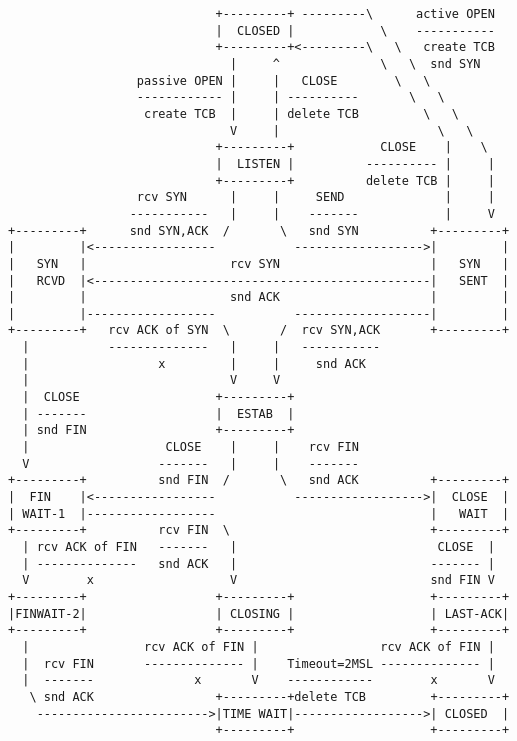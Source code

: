 \documentclass[varwidth=38em,crop]{standalone}
\begin{document}
\pagestyle{empty}

\begin{verbatim}
                             +---------+ ---------\      active OPEN
                             |  CLOSED |            \    -----------
                             +---------+<---------\   \   create TCB
                               |     ^              \   \  snd SYN
                  passive OPEN |     |   CLOSE        \   \
                  ------------ |     | ----------       \   \
                   create TCB  |     | delete TCB         \   \
                               V     |                      \   \
                             +---------+            CLOSE    |    \
                             |  LISTEN |          ---------- |     |
                             +---------+          delete TCB |     |
                  rcv SYN      |     |     SEND              |     |
                 -----------   |     |    -------            |     V
+---------+      snd SYN,ACK  /       \   snd SYN          +---------+
|         |<-----------------           ------------------>|         |
|   SYN   |                    rcv SYN                     |   SYN   |
|   RCVD  |<-----------------------------------------------|   SENT  |
|         |                    snd ACK                     |         |
|         |------------------           -------------------|         |
+---------+   rcv ACK of SYN  \       /  rcv SYN,ACK       +---------+
  |           --------------   |     |   -----------
  |                  x         |     |     snd ACK
  |                            V     V
  |  CLOSE                   +---------+
  | -------                  |  ESTAB  |
  | snd FIN                  +---------+
  |                   CLOSE    |     |    rcv FIN
  V                  -------   |     |    -------
+---------+          snd FIN  /       \   snd ACK          +---------+
|  FIN    |<-----------------           ------------------>|  CLOSE  |
| WAIT-1  |------------------                              |   WAIT  |
+---------+          rcv FIN  \                            +---------+
  | rcv ACK of FIN   -------   |                            CLOSE  |
  | --------------   snd ACK   |                           ------- |
  V        x                   V                           snd FIN V
+---------+                  +---------+                   +---------+
|FINWAIT-2|                  | CLOSING |                   | LAST-ACK|
+---------+                  +---------+                   +---------+
  |                rcv ACK of FIN |                 rcv ACK of FIN |
  |  rcv FIN       -------------- |    Timeout=2MSL -------------- |
  |  -------              x       V    ------------        x       V
   \ snd ACK                 +---------+delete TCB         +---------+
    ------------------------>|TIME WAIT|------------------>| CLOSED  |
                             +---------+                   +---------+
\end{verbatim}
\end{document}
